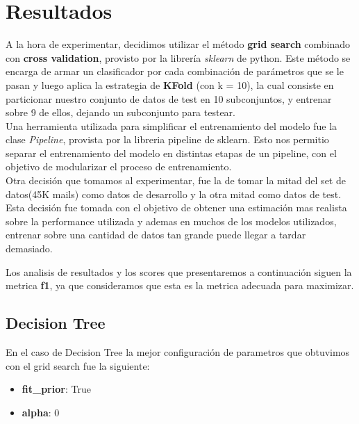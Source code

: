 \newcommand\MyBox[2]{
  \fbox{\lower0.75cm
    \vbox to 1.7cm{\vfil
      \hbox to 1.7cm{\hfil\parbox{1.4cm}{#1\\#2}\hfil}
      \vfil}%
  }%
}

\noindent
\renewcommand\arraystretch{1.5}
\setlength\tabcolsep{0pt}

\section{Resultados}
A la hora de experimentar, decidimos utilizar el método \textbf{grid search} combinado con \textbf{cross validation}, provisto por la librería \textit{sklearn} de python.
Este método se encarga de armar un clasificador por cada combinación de parámetros que se le pasan y luego aplica la estrategia de \textbf{KFold} (con k = 10), la cual
consiste en particionar nuestro conjunto de datos de test en 10 subconjuntos, y entrenar sobre 9 de ellos, dejando un subconjunto para testear.\\

Una herramienta utilizada para simplificar el entrenamiento del modelo fue la clase \textit{Pipeline}, provista por la
libreria pipeline de sklearn. Esto nos permitio separar el entrenamiento del modelo en distintas etapas de un pipeline,
con el objetivo de modularizar el proceso de entrenamiento. \\

Otra decisión que tomamos al experimentar, fue la de tomar la mitad del set de datos(45K mails) como datos de desarrollo y la otra mitad como datos
de test. Esta decisión fue tomada con el objetivo de obtener una estimación mas realista sobre la performance utilizada y ademas en muchos de los modelos
utilizados, entrenar sobre una cantidad de datos tan grande puede llegar a tardar demasiado.

Los analisis de resultados y los scores que presentaremos a continuación siguen la metrica \textbf{f1}, ya que consideramos
que esta es la metrica adecuada para maximizar.

\subsection{Decision Tree}
En el caso de Decision Tree la mejor configuración de parametros que obtuvimos con el grid search fue la siguiente:
\begin{itemize}
\item{\textbf{fit\_prior}: True}
\item{\textbf{alpha}: 0}
\end{itemize}

